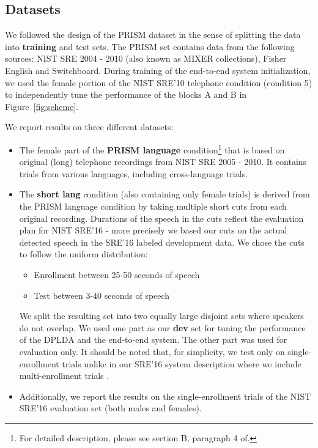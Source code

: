 \documentclass{article}
\begin{document}
\subsection{Datasets}

We followed the design of the PRISM\cite{PRISM} dataset in the sense of splitting the data into {\bf training} and test sets. The PRISM set contains data from the following sources: NIST SRE 2004 - 2010 (also known as MIXER collections), Fisher English and Switchboard. During training of the end-to-end system initialization, we used the female portion of the NIST SRE'10 telephone condition (condition 5) to independently tune the performance of the blocks A and B in Figure~\ref{fig:scheme}.

We report results on three different datasets: 
\begin{itemize}
\item The female part of the {\bf PRISM language} condition\footnote{For detailed description, please see section B, paragraph 4 of\cite{PRISM}.} that is based on original (long) telephone recordings from NIST SRE 2005 - 2010. It contains trials from various languages, including cross-language trials. 

\item The {\bf short lang} condition (also containing only female trials) is derived from the PRISM language condition by taking multiple short cuts from each original recording. Durations of the speech in the cuts reflect the evaluation plan for NIST SRE'16 - more precisely we based our cuts on the actual detected speech in the SRE'16 labeled development data. We chose the cuts to follow the uniform distribution:

\begin{itemize}
\item Enrollment between 25-50 seconds of speech
\item Test between 3-40 seconds of speech
\end{itemize}

We split the resulting set into two equally large disjoint sets where speakers do not overlap. We used one part as our {\bf dev} set for tuning the performance of the DPLDA and the end-to-end system. The other part was used for evaluation only. It should be noted that, for simplicity, we test only on single-enrollment trials unlike in our SRE'16 system description where we include multi-enrollment trials \cite{Interspeech2017:Plchot}.

\item Additionally, we report the results on the single-enrollment trials of the NIST SRE'16 evaluation set (both males and females).
\end{itemize}
\end{document}
